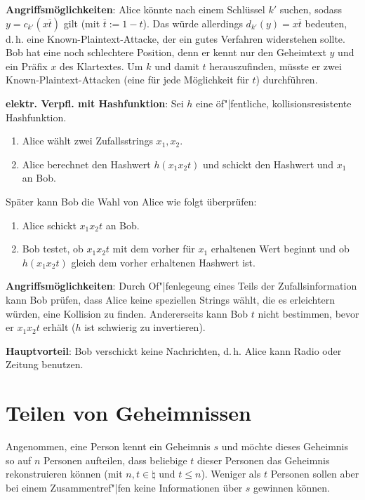 \textbf{Angriffsmöglichkeiten}:
Alice könnte nach einem Schlüssel $k'$ suchen, sodass $y = c_{k'}(x\overline{t})$ gilt
(mit $\overline{t} := 1 - t$).
Das würde allerdings $d_{k'}(y) = x\overline{t}$ bedeuten,
d.\,h. eine Known-Plaintext-Attacke, der ein gutes Verfahren widerstehen sollte.
Bob hat eine noch schlechtere Position, denn er kennt nur den Geheimtext $y$ und
ein Präfix $x$ des Klartextes.
Um $k$ und damit $t$ herauszufinden, müsste er zwei Known-Plaintext-Attacken
(eine für jede Möglichkeit für $t$) durchführen.

\linie

\textbf{elektr. Verpfl. mit Hashfunktion}:
Sei $h$ eine öf"|fentliche, kollisionsresistente Hashfunktion.
\begin{enumerate}
    \item
    Alice wählt zwei Zufallsstrings $x_1, x_2$.

    \item
    Alice berechnet den Hashwert $h(x_1 x_2 t)$ und schickt den Hashwert und $x_1$ an Bob.
\end{enumerate}
Später kann Bob die Wahl von Alice wie folgt überprüfen:
\begin{enumerate}
    \item
    Alice schickt $x_1 x_2 t$ an Bob.

    \item
    Bob testet, ob $x_1 x_2 t$ mit dem vorher für $x_1$ erhaltenen Wert beginnt und ob
    $h(x_1 x_2 t)$ gleich dem vorher erhaltenen Hashwert ist.
\end{enumerate}

\textbf{Angriffsmöglichkeiten}:
Durch Of"|fenlegeung eines Teils der Zufallsinformation kann Bob prüfen,
dass Alice keine speziellen Strings wählt, die es erleichtern würden, eine Kollision zu finden.
Andererseits kann Bob $t$ nicht bestimmen, bevor er $x_1 x_2 t$ erhält
($h$ ist schwierig zu invertieren).

\textbf{Hauptvorteil}:
Bob verschickt keine Nachrichten, d.\,h. Alice kann Radio oder Zeitung benutzen.

\pagebreak

\section{%
    Teilen von Geheimnissen%
}

Angenommen, eine Person kennt ein Geheimnis $s$ und möchte dieses Geheimnis so auf
$n$ Personen aufteilen, dass beliebige $t$ dieser Personen das Geheimnis rekonstruieren können
(mit $n, t \in \natural$ und $t \le n$).
Weniger als $t$ Personen sollen aber bei einem Zusammentref"|fen keine Informationen über $s$
gewinnen können.

